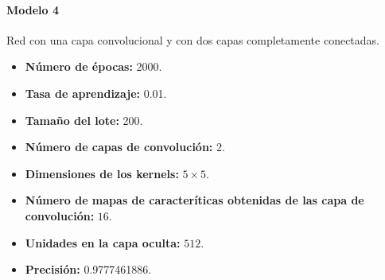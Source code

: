 


\paragraph{Modelo 4}

Red con una capa convolucional y con dos capas
completamente conectadas.

\begin{itemize}
\item \textbf{Número de épocas:} 2000.
\item \textbf{Tasa de aprendizaje:} 0.01.
\item \textbf{Tamaño del lote:} 200.
\item \textbf{Número de capas de convolución:} 2.
\item \textbf{Dimensiones de los kernels:} $5 \times 5$.
\item \textbf{Número de mapas de caracteríticas obtenidas de las capa de convolución:} $16$.
\item \textbf{Unidades en la capa oculta:} $512$.
\item \textbf{Precisión:} 0.9777461886.
\end{itemize}


